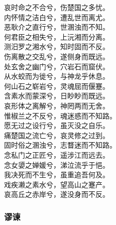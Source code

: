 \documentclass[]{article}
\begin{document}
哀时命之不合兮，伤楚国之多忧。\\
内怀情之洁白兮，遭乱世而离尤。\\
恶耿介之直行兮，世溷浊而不知。\\
何君臣之相失兮，上沅湘而分离。\\
测汨罗之湘水兮，知时固而不反。\\
伤离散之交乱兮，遂侧身而既远。\\
处玄舍之幽门兮，穴岩石而窟伏。\\
从水蛟而为徙兮，与神龙乎休息。\\
何山石之崭岩兮，灵魂屈而偃蹇。\\
含素水而蒙深兮，日眇眇而既远。\\
哀形体之离解兮，神罔两而无舍。\\
惟椒兰之不反兮，魂迷惑而不知路。\\
愿无过之设行兮，虽灭没之自乐。\\
痛楚国之流亡兮，哀灵修之过到。\\
固时俗之溷浊兮，志瞀迷而不知路。\\
念私门之正匠兮，遥涉江而远去。\\
念女嬃之婵媛兮，涕泣流乎于悒。\\
我决死而不生兮，虽重追吾何及。\\
戏疾濑之素水兮，望高山之蹇产。\\
哀高丘之赤岸兮，遂没身而不反。

\hypertarget{header-n3016}{%
\subsubsection{谬谏}\label{header-n3016}}
\end{document}
